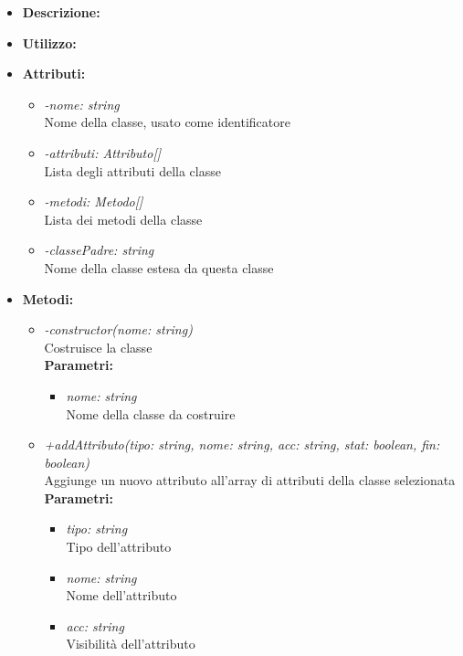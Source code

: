 \begin{itemize}
	\item \textbf{Descrizione:}\\
	
	\item \textbf{Utilizzo:}\\
	
	\item \textbf{Attributi:}
		\begin{itemize}
			\item \emph{-nome: string}\\
			Nome della classe, usato come identificatore
			\item \emph{-attributi: Attributo[]}\\
			Lista degli attributi della classe
			\item \emph{-metodi: Metodo[]}\\
			Lista dei metodi della classe
			\item \emph{-classePadre: string}\\
			Nome della classe estesa da questa classe
		\end{itemize}
	\item \textbf{Metodi:}
		\begin{itemize}
			\item \emph{-constructor(nome: string)}\\
    		Costruisce la classe\\
    		\textbf{Parametri:}
    		\begin{itemize}
    			\item \emph{nome: string}\\
    			Nome della classe da costruire
    		\end{itemize}
    		\item \emph{+addAttributo(tipo: string, nome: string, acc: string, stat: boolean, fin: boolean)}\\
    		Aggiunge un nuovo attributo all'array di attributi della classe selezionata\\
    		\textbf{Parametri:}
    		\begin{itemize}
    			\item \emph{tipo: string}\\
    			Tipo dell'attributo
    			\item \emph{nome: string}\\
    			Nome dell'attributo
    			\item \emph{acc: string}\\
    			Visibilità dell'attributo

\end{itemize}
\end{itemize}
\end{itemize}

